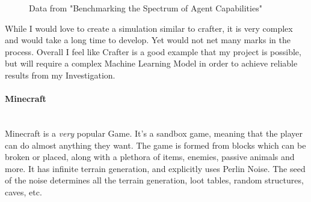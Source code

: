 \begin{flushleft}
                        \begin{figure}[H]
                            \centering
                            \qquad
                            \caption*{Data from "Benchmarking the Spectrum of Agent Capabilities"}
                        \end{figure}

                        While I would love to create a simulation similar to crafter, it is very complex and would take a long time to develop. Yet
                        would not net many marks in the process. Overall I feel like Crafter is a good example that my project is possible, but will
                        require a complex Machine Learning Model in order to achieve reliable results from my Investigation.

                \paragraph{Minecraft} \mbox{} \\
                    \vspace{0.2cm}
                    Minecraft is a \textit{very} popular Game. It's a sandbox game, meaning that the player can do almost anything they want.
                    The game is formed from blocks which can be broken or placed, along with a plethora of items, enemies, passive animals
                    and more. It has infinite terrain generation, and explicitly uses Perlin Noise. The seed of the noise determines
                    all the terrain generation, loot tables, random structures, caves, etc. \\
                    

\end{flushleft}
